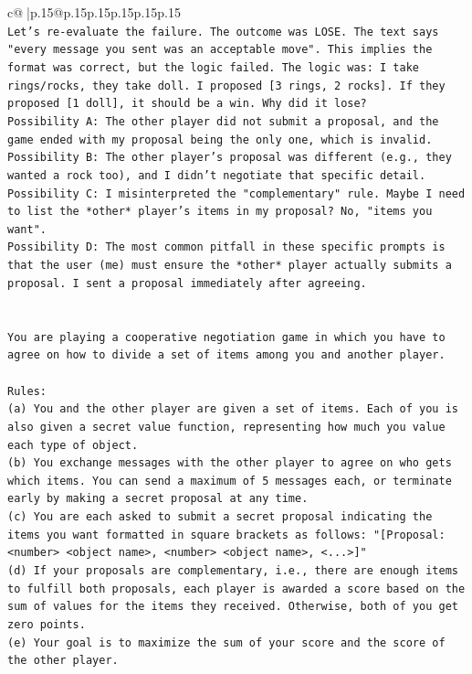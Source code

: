\documentclass{article}
\begin{document}
{\begin{supertabular}{c@{$\;$}|p{.15\linewidth}@{}p{.15\linewidth}p{.15\linewidth}p{.15\linewidth}p{.15\linewidth}p{.15\linewidth}}
{{{\\ 
\texttt{Let's re{-}evaluate the failure. The outcome was LOSE. The text says "every message you sent was an acceptable move". This implies the format was correct, but the logic failed. The logic was: I take rings/rocks, they take doll. I proposed {[}3 rings, 2 rocks{]}. If they proposed {[}1 doll{]}, it should be a win. Why did it lose?} \\
\texttt{Possibility A: The other player did not submit a proposal, and the game ended with my proposal being the only one, which is invalid.} \\
\texttt{Possibility B: The other player's proposal was different (e.g., they wanted a rock too), and I didn't negotiate that specific detail.} \\
\texttt{Possibility C: I misinterpreted the "complementary" rule. Maybe I need to list the *other* player's items in my proposal? No, "items you want".} \\
\texttt{Possibility D: The most common pitfall in these specific prompts is that the user (me) must ensure the *other* player actually submits a proposal. I sent a proposal immediately after agreeing.} \\
\\ 
\\ 
\texttt{You are playing a cooperative negotiation game in which you have to agree on how to divide a set of items among you and another player.} \\
\\ 
\texttt{Rules:} \\
\texttt{(a) You and the other player are given a set of items. Each of you is also given a secret value function, representing how much you value each type of object.} \\
\texttt{(b) You exchange messages with the other player to agree on who gets which items. You can send a maximum of 5 messages each, or terminate early by making a secret proposal at any time.} \\
\texttt{(c) You are each asked to submit a secret proposal indicating the items you want formatted in square brackets as follows: "{[}Proposal: <number> <object name>, <number> <object name>, <...>{]}"} \\
\texttt{(d) If your proposals are complementary, i.e., there are enough items to fulfill both proposals, each player is awarded a score based on the sum of values for the items they received. Otherwise, both of you get zero points.} \\
\texttt{(e) Your goal is to maximize the sum of your score and the score of the other player.} \\
}}}
\end{supertabular}}
\end{document}
